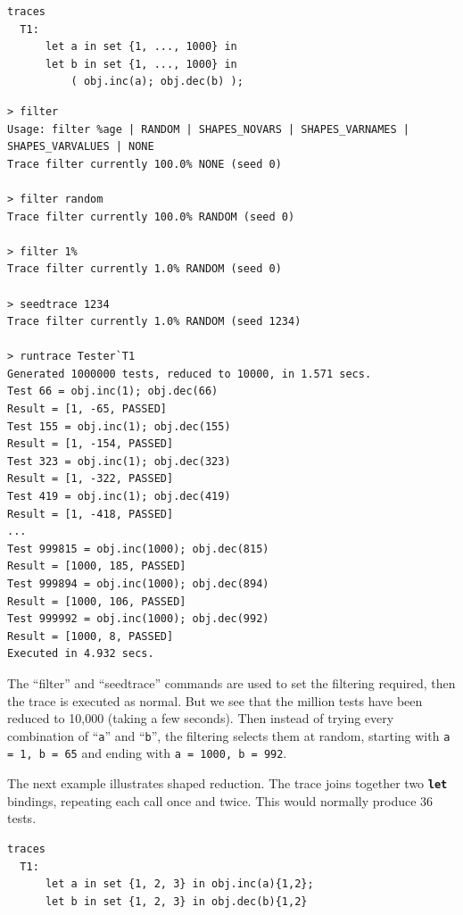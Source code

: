 \documentclass{overturerepchap}
\begin{document}
\small
\begin{lstlisting}
traces
  T1:
      let a in set {1, ..., 1000} in
      let b in set {1, ..., 1000} in
          ( obj.inc(a); obj.dec(b) );
\end{lstlisting}

\lstset{style=tool,language=}
\scriptsize
\begin{lstlisting}[escapechar=@]
> filter
Usage: filter %age | RANDOM | SHAPES_NOVARS | SHAPES_VARNAMES | SHAPES_VARVALUES | NONE
Trace filter currently 100.0% NONE (seed 0)
 
> filter random
Trace filter currently 100.0% RANDOM (seed 0)

> filter 1%
Trace filter currently 1.0% RANDOM (seed 0)

> seedtrace 1234
Trace filter currently 1.0% RANDOM (seed 1234)

> runtrace Tester`T1
Generated 1000000 tests, reduced to 10000, in 1.571 secs. 
Test 66 = obj.inc(1); obj.dec(66)
Result = [1, -65, PASSED]
Test 155 = obj.inc(1); obj.dec(155)
Result = [1, -154, PASSED]
Test 323 = obj.inc(1); obj.dec(323)
Result = [1, -322, PASSED]
Test 419 = obj.inc(1); obj.dec(419)
Result = [1, -418, PASSED]
...
Test 999815 = obj.inc(1000); obj.dec(815)
Result = [1000, 185, PASSED]
Test 999894 = obj.inc(1000); obj.dec(894)
Result = [1000, 106, PASSED]
Test 999992 = obj.inc(1000); obj.dec(992)
Result = [1000, 8, PASSED]
Executed in 4.932 secs. 
\end{lstlisting}
\lstset{style=mystyle}
\lstset{language=VDM++}
\normalsize

\noindent The ``filter'' and ``seedtrace'' commands are used to set the filtering
required, then the trace is executed as normal. But we see that the million
tests have been reduced to 10,000 (taking a few seconds). Then instead of trying
every combination of ``\texttt{a}'' and ``\texttt{b}'', the filtering selects them at random,
starting with \texttt{a = 1, b = 65} and ending with \texttt{a = 1000, b = 992}.

The next example illustrates shaped reduction. The trace joins together two
\texttt{\textbf{let}} bindings, repeating each call once and twice. This would normally
produce 36 tests.

\small
\begin{lstlisting}
traces
  T1:
      let a in set {1, 2, 3} in obj.inc(a){1,2};
      let b in set {1, 2, 3} in obj.dec(b){1,2}
\end{lstlisting}
\end{document}
